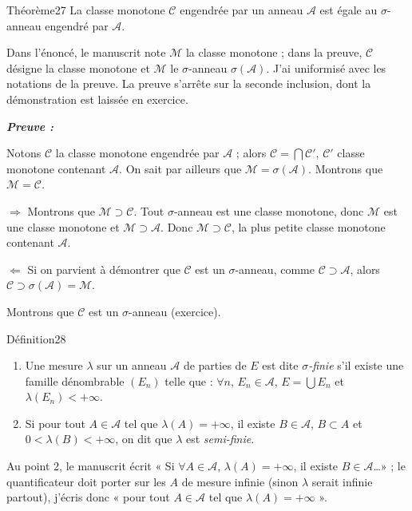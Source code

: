 \documentclass[11pt,a4paper]{article}
\newcommand{\A}{\mathscr{A}}
\newcommand{\C}{\mathscr{C}}
\newcommand{\M}{\mathscr{M}}
\newenvironment{preuve}{\par\textit{\textbf{Preuve :}}\par\nopagebreak[4]}{\par}
\begin{document}
\begin{enonce}{Théorème}{27}
La classe monotone $\C$ engendrée par un anneau $\A$ est égale au $\sigma$-anneau engendré par $\A$.
\end{enonce}

\begin{note}
Dans l'énoncé, le manuscrit note $\M$ la classe monotone ; dans la preuve, $\C$ désigne la classe monotone et $\M$ le $\sigma$-anneau $\sigma(\A)$.
J'ai uniformisé avec les notations de la preuve. La preuve s'arrête sur la seconde inclusion, dont la démonstration est laissée en exercice.
\end{note}

\begin{preuve}
Notons $\C$ la classe monotone engendrée par $\A$ ; alors $\C=\bigcap\C'$, $\C'$ classe monotone contenant $\A$.
On sait par ailleurs que $\M=\sigma(\A)$. Montrons que $\M=\C$.

$\Longrightarrow$ Montrons que $\M\supset\C$.
Tout $\sigma$-anneau est une classe monotone, donc $\M$ est une classe monotone et $\M\supset\A$.
Donc $\M\supset\C$, la plus petite classe monotone contenant $\A$.

$\Longleftarrow$ Si on parvient à démontrer que $\C$ est un $\sigma$-anneau, comme $\C\supset\A$, alors $\C\supset\sigma(\A)=\M$.

Montrons que $\C$ est un $\sigma$-anneau (exercice).
\end{preuve}

\begin{enonce}{Définition}{28}
\begin{enumerate}[label=\textbf{\arabic*-},leftmargin=1.2cm]
  \item Une mesure $\lambda$ sur un anneau $\A$ de parties de $E$ est dite \emph{$\sigma$-finie} s'il existe une famille dénombrable $(E_n)$ telle que :
        $\forall n$, $E_n\in\A$, $E=\bigcup E_n$ et $\lambda(E_n)<+\infty$.
  \item Si pour tout $A\in\A$ tel que $\lambda(A)=+\infty$, il existe $B\in\A$, $B\subset A$ et $0<\lambda(B)<+\infty$,
        on dit que $\lambda$ est \emph{semi-finie}.
\end{enumerate}
\end{enonce}

\begin{note}
Au point 2, le manuscrit écrit « Si $\forall A\in\A$, $\lambda(A)=+\infty$, il existe $B\in\A$\dots » ; le quantificateur doit porter sur les $A$ de mesure infinie
(sinon $\lambda$ serait infinie partout), j'écris donc « pour tout $A\in\A$ tel que $\lambda(A)=+\infty$ ».
\end{note}
\end{document}
